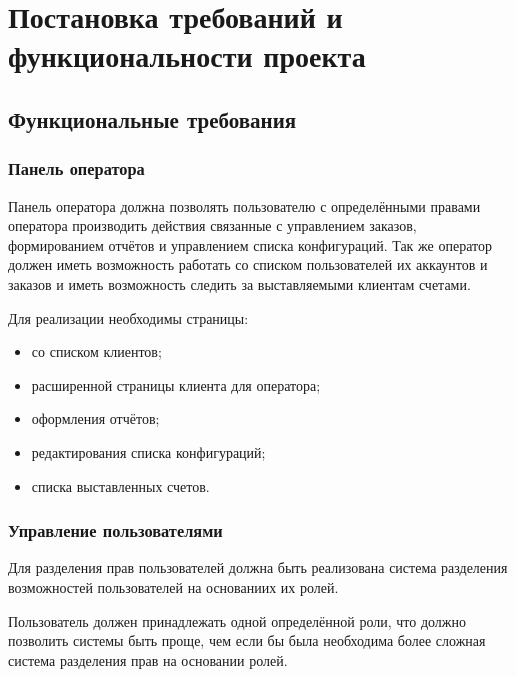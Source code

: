 \chapter{Постановка требований и функциональности проекта}\label{ch:ch2}


\section{Функциональные требования}\label{sec:ch2/sec2}

\subsection{Панель оператора}\label{sec:operator_control}
Панель оператора должна позволять пользователю с определёнными правами оператора производить действия связанные с управлением заказов, формированием отчётов и управлением списка конфигураций. Так же оператор должен иметь возможность работать со списком пользователей их аккаунтов и заказов и иметь возможность следить за выставляемыми клиентам счетами.

Для реализации необходимы страницы:
\begin{itemize}
  \item со списком клиентов;
  \item расширенной страницы клиента для оператора;
  \item оформления отчётов;
  \item редактирования списка конфигураций;
  \item списка выставленных счетов.
\end{itemize}

\subsection{Управление пользователями}\label{sec:users_control}
Для разделения прав пользователей должна быть реализована система разделения возможностей пользователей на основаниих их ролей.

Пользователь должен принадлежать одной определённой роли, что должно позволить системы быть проще, чем если бы была необходима более сложная система разделения прав на основании ролей. 

